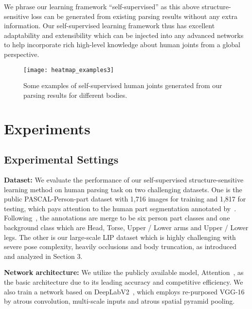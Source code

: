 \documentclass[10pt,twocolumn,letterpaper]{article}
\begin{document}
We phrase our learning framework ``self-supervised'' as this above structure-sensitive loss can be generated from existing parsing results without any extra information. Our self-supervised learning framework thus has excellent adaptability and extensibility which can be injected into any advanced networks to help incorporate rich
high-level knowledge about human joints from a global perspective. 
\begin{figure}[t]
\centering
\texttt{[image: heatmap\_examples3]}
\vspace{-3mm}
\caption{Some examples of self-supervised human joints generated from our parsing results for different bodies.}
\vspace{-4mm}
\label{fig:heatmap_example}
\end{figure}

\section{Experiments}
\subsection{Experimental Settings}
\textbf{Dataset: }
We evaluate the performance of our self-supervised structure-sensitive learning method on human parsing task on two challenging datasets. One is the public PASCAL-Person-part dataset with 1,716 images for training and 1,817 for testing, which pays attention to the human part segmentation annotated by~\cite{chen2014detect}. Following~\cite{chen2015attention,xia2015zoom}, the annotations are merge to be six person part classes and one background class which are Head, Torse, Upper / Lower arms and Upper / Lower legs. The other is our large-scale LIP dataset which is highly challenging with severe pose complexity, heavily occlusions and body truncation, as introduced and analyzed in Section 3.

\textbf{Network architecture: }
We utilize the publicly available model, Attention~\cite{chen2015attention}, as the basic architecture due to its leading accuracy and competitive efficiency. We also train a network based on DeepLabV2~\cite{chen2014semantic}, which employs re-purposed VGG-16 by atrous convolution, multi-scale inputs and atrous spatial pyramid pooling.
\end{document}

